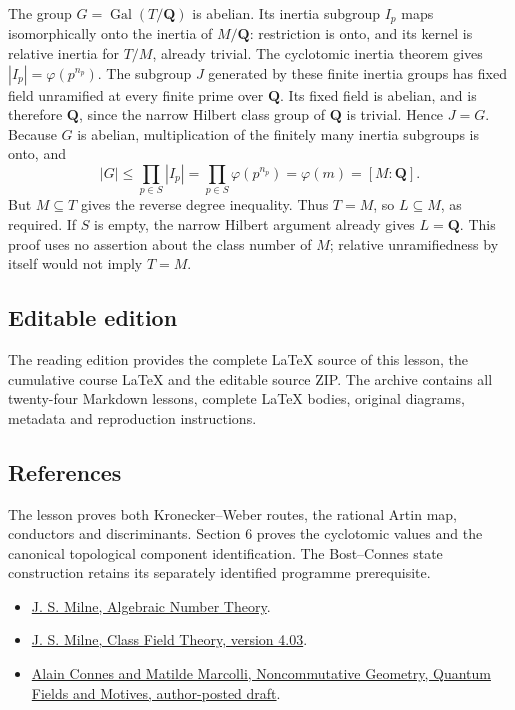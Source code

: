 \documentclass[11pt,a4paper]{article}
\newcommand{\tightlist}{\setlength{\itemsep}{0pt}\setlength{\parskip}{0pt}}
\begin{document}
The group \(G=\operatorname{Gal}(T/\mathbf Q)\) is abelian. Its inertia
subgroup \(I_p\) maps isomorphically onto the inertia of
\(M/\mathbf Q\): restriction is onto, and its kernel is relative inertia
for \(T/M\), already trivial. The cyclotomic inertia theorem gives
\(|I_p|=\varphi(p^{n_p})\). The subgroup \(J\) generated by these finite
inertia groups has fixed field unramified at every finite prime over
\(\mathbf Q\). Its fixed field is abelian, and is therefore
\(\mathbf Q\), since the narrow Hilbert class group of \(\mathbf Q\) is
trivial. Hence \(J=G\). Because \(G\) is abelian, multiplication of the
finitely many inertia subgroups is onto, and \[
|G|\leq\prod_{p\in S}|I_p|=\prod_{p\in S}\varphi(p^{n_p})
=\varphi(m)=[M:\mathbf Q].
\] But \(M\subseteq T\) gives the reverse degree inequality. Thus
\(T=M\), so \(L\subseteq M\), as required. If \(S\) is empty, the narrow
Hilbert argument already gives \(L=\mathbf Q\). This proof uses no
assertion about the class number of \(M\); relative unramifiedness by
itself would not imply \(T=M\).

\subsection{Editable edition}\label{editable-edition}

The reading edition provides the complete LaTeX source of this lesson,
the cumulative course LaTeX and the editable source ZIP. The archive
contains all twenty-four Markdown lessons, complete LaTeX bodies,
original diagrams, metadata and reproduction instructions.

\subsection{References}\label{references}

The lesson proves both Kronecker--Weber routes, the rational Artin map,
conductors and discriminants. Section 6 proves the cyclotomic values and
the canonical topological component identification. The Bost--Connes
state construction retains its separately identified programme
prerequisite.

\begin{itemize}
\tightlist
\item
  \href{https://www.jmilne.org/math/CourseNotes/ANT.pdf}{J. S. Milne,
  Algebraic Number Theory}.
\item
  \href{https://www.jmilne.org/math/CourseNotes/CFT.pdf}{J. S. Milne,
  Class Field Theory, version 4.03}.
\item
  \href{https://alainconnes.org/wp-content/uploads/bookwebfinal-2.pdf}{Alain
  Connes and Matilde Marcolli, Noncommutative Geometry, Quantum Fields
  and Motives, author-posted draft}.
\end{itemize}
\end{document}
